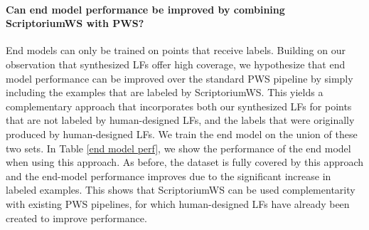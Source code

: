 \paragraph{Can end model performance be improved by combining ScriptoriumWS with PWS?}
End models can only be trained on points that receive labels. 
Building on our observation that synthesized LFs offer high coverage, we hypothesize that end model performance can be improved over the standard PWS pipeline by simply including the examples that are labeled by ScriptoriumWS.
%
This yields a complementary approach that incorporates both our synthesized LFs for points that are not labeled by human-designed LFs, and the labels that were originally produced by human-designed LFs. 
We train the end model on the union of these two sets. 
%
In Table \ref{end model perf}, we show the performance of the end model when using this approach.
As before, the dataset is fully covered by this approach and the end-model performance improves due to the significant increase in labeled examples. 
This shows that ScriptoriumWS can be used complementarity with existing PWS pipelines, for which human-designed LFs have already been created to improve performance. 

